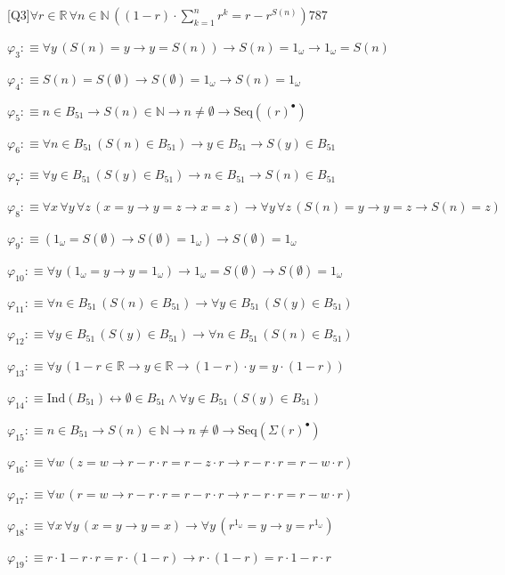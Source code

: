 \begin{fullproof}{[Q3]}{$\forall r \in \mathbb{R}\,\forall n \in \mathbb{N}\,((1 - r) \cdot {\textstyle\sum_{k=1}^{n} {{r}^{k}}} = r - {{r}^{S(n)}})$}{787}
\begin{abbrevlist}
\item $\varphi_{3} :\equiv \forall y\,(S(n) = y \to y = S(n)) \to S(n) = 1_{\omega} \to 1_{\omega} = S(n)$
\item $\varphi_{4} :\equiv S(n) = S(\emptyset) \to S(\emptyset) = 1_{\omega} \to S(n) = 1_{\omega}$
\item $\varphi_{5} :\equiv n \in B_{51} \to S(n) \in \mathbb{N} \to n \neq \emptyset \to \mathrm{Seq}({(r)^{\bullet}})$
\item $\varphi_{6} :\equiv \forall n \in B_{51}\,(S(n) \in B_{51}) \to y \in B_{51} \to S(y) \in B_{51}$
\item $\varphi_{7} :\equiv \forall y \in B_{51}\,(S(y) \in B_{51}) \to n \in B_{51} \to S(n) \in B_{51}$
\item $\varphi_{8} :\equiv \forall x\,\forall y\,\forall z\,(x = y \to y = z \to x = z) \to \forall y\,\forall z\,(S(n) = y \to y = z \to S(n) = z)$
\item $\varphi_{9} :\equiv (1_{\omega} = S(\emptyset) \to S(\emptyset) = 1_{\omega}) \to S(\emptyset) = 1_{\omega}$
\item $\varphi_{10} :\equiv \forall y\,(1_{\omega} = y \to y = 1_{\omega}) \to 1_{\omega} = S(\emptyset) \to S(\emptyset) = 1_{\omega}$
\item $\varphi_{11} :\equiv \forall n \in B_{51}\,(S(n) \in B_{51}) \to \forall y \in B_{51}\,(S(y) \in B_{51})$
\item $\varphi_{12} :\equiv \forall y \in B_{51}\,(S(y) \in B_{51}) \to \forall n \in B_{51}\,(S(n) \in B_{51})$
\item $\varphi_{13} :\equiv \forall y\,(1 - r \in \mathbb{R} \to y \in \mathbb{R} \to (1 - r) \cdot y = y \cdot (1 - r))$
\item $\varphi_{14} :\equiv \mathrm{Ind}(B_{51}) \leftrightarrow \emptyset \in B_{51} \land \forall y \in B_{51}\,(S(y) \in B_{51})$
\item $\varphi_{15} :\equiv n \in B_{51} \to S(n) \in \mathbb{N} \to n \neq \emptyset \to \mathrm{Seq}(\Sigma {(r)^{\bullet}})$
\item $\varphi_{16} :\equiv \forall w\,(z = w \to r - r \cdot r = r - z \cdot r \to r - r \cdot r = r - w \cdot r)$
\item $\varphi_{17} :\equiv \forall w\,(r = w \to r - r \cdot r = r - r \cdot r \to r - r \cdot r = r - w \cdot r)$
\item $\varphi_{18} :\equiv \forall x\,\forall y\,(x = y \to y = x) \to \forall y\,({{r}^{1_{\omega}}} = y \to y = {{r}^{1_{\omega}}})$
\item $\varphi_{19} :\equiv r \cdot 1 - r \cdot r = r \cdot (1 - r) \to r \cdot (1 - r) = r \cdot 1 - r \cdot r$

\end{abbrevlist}
\end{fullproof}

